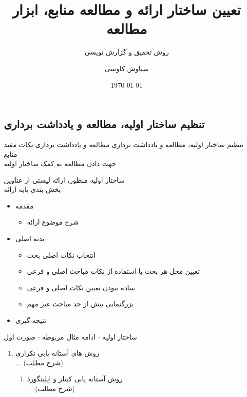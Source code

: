 \documentclass[14pt]{beamer}
\title{تعیین ساختار ارائه و مطالعه منابع، ابزار مطالعه}
\subtitle{\color{black} روش تحقیق و گزارش نویسی}
\date{\today}
\author{سیاوش کاوسی}
\institute{دانشگاه صنعتی امیرکبیر}
\makeatletter
\newcommand{\rtlist}{\raggedleft\rightskip\@totalleftmargin}
\newcommand{\sectionfontsize}{\fontsize{22pt}{0pt}\selectfont}
\newcommand{\framefontsizelarge}{\fontsize{18pt}{0pt}\selectfont}
\newcommand{\frametitlefontsize}{\fontsize{20pt}{0pt}\selectfont}
\newcommand{\defaultvspace}{\vspace{5mm}}
\makeatother
\begin{document}
\begin{persian}
	\maketitle
	\everypar{\rightskip\rightmargin}		
	
	\section{\sectionfontsize تنظیم ساختار اولیه، مطالعه و یادداشت برداری}	
	
	\begin{frame}{\frametitlefontsize تنظیم ساختار اولیه، مطالعه و یادداشت برداری}
		\framefontsizelarge
		مطالعه و یادداشت برداری نکات مفید منابع \defaultvspace\\
		جهت دادن مطالعه به کمک ساختار اولیه
	\end{frame}	
	
	\begin{frame}{\frametitlefontsize ساختار اولیه}
		منظور، ارائه لیستی از عناوین \defaultvspace\\
		بخش بندی پایه ارائه
		\begin{itemize}\rtlist
			\item مقدمه
			\begin{itemize}\rtlist
				\item شرح موضوع ارائه
			\end{itemize}
			
			\item بدنه اصلی
			\begin{itemize}\rtlist
				\item انتخاب نکات اصلی بحث\\
				\item تعیین محل هر بحث با استفاده از نکات مباحث اصلی و فرعی
				\item ساده نبودن تعیین نکات اصلی و فرعی
				\item بزرگنمایی بیش از حد مباحث غیر مهم
			\end{itemize}
			
			\item نتیجه گیری
		\end{itemize}
	\end{frame}
	
	\begin{frame}{\frametitlefontsize ساختار اولیه - ادامه}
		مثال مربوطه - صورت اول
		\begin{enumerate}\rtlist
			\item روش های آستانه یابی تکراری
			\\ ... (شرح مطلب)
			\begin{enumerate}\rtlist
				\item روش آستانه یابی کیتلر و ایلینگورذ
				\\ ... (شرح مطلب)
			\end{enumerate}
			

\end{enumerate}
\end{frame}
\end{persian}
\end{document}
